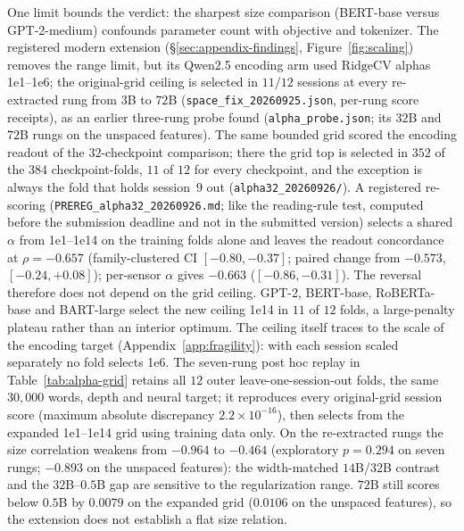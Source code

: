 \documentclass{article}
\begin{document}
One limit bounds the verdict: the sharpest size comparison (BERT-base versus GPT-2-medium)
confounds parameter count with objective and tokenizer. The registered modern extension
(\S\ref{sec:appendix-findings}, Figure~\ref{fig:scaling}) removes the range limit, but its
Qwen2.5 encoding arm used $\mathrm{RidgeCV}$ alphas 1e1--1e6; the original-grid ceiling
is selected in $11/12$ sessions at every re-extracted rung from $3$B to $72$B
(\texttt{space\_fix\_20260925.json}, per-rung score receipts), as an earlier three-rung probe found
(\texttt{alpha\_probe.json}; its $32$B and $72$B rungs on the unspaced features). The same bounded
grid scored the encoding readout of the $32$-checkpoint comparison; there the grid top is selected in
$352$ of the $384$ checkpoint-folds, $11$ of $12$ for every checkpoint, and the exception is always the
fold that holds session~$9$ out (\texttt{alpha32\_20260926/}). A registered re-scoring
(\texttt{PREREG\_alpha32\_20260926.md}; like the reading-rule test, computed before the submission
deadline and not in the submitted version) selects a shared $\alpha$ from 1e1--1e14 on the training
folds alone and leaves the readout concordance at $\rho = -0.657$ (family-clustered CI $[-0.80, -0.37]$;
paired change from $-0.573$, $[-0.24, +0.08]$); per-sensor $\alpha$ gives $-0.663$ ($[-0.86, -0.31]$).
The reversal therefore does not depend on the grid ceiling. GPT-2, BERT-base, RoBERTa-base and
BART-large select the new ceiling 1e14 in $11$ of $12$ folds, a large-penalty plateau rather than an
interior optimum. The ceiling itself traces to the scale of the encoding target
(Appendix~\ref{app:fragility}): with each session scaled separately no fold selects 1e6.
The seven-rung post hoc replay in Table~\ref{tab:alpha-grid} retains all $12$ outer
leave-one-session-out folds, the same $30{,}000$ words, depth and neural target; it reproduces
every original-grid session score (maximum absolute discrepancy $2.2\times10^{-16}$), then
selects from the expanded 1e1--1e14 grid using training data only.
On the re-extracted rungs the size correlation weakens from $-0.964$ to $-0.464$ (exploratory $p=0.294$ on seven rungs; $-0.893$ on the unspaced features):
the width-matched $14$B/$32$B contrast and the $32$B--$0.5$B gap are sensitive to the
regularization range. $72$B still scores below $0.5$B by $0.0079$ on the expanded grid
($0.0106$ on the unspaced features), so the extension does not establish a flat size relation.
\end{document}
